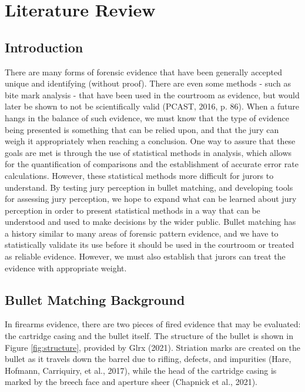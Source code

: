 \documentclass[print]{nuthesis}
\begin{document}
\hypertarget{litreview}{%
\chapter{Literature Review}\label{litreview}}

\hypertarget{introduction}{%
\section{Introduction}\label{introduction}}

There are many forms of forensic evidence that have been generally accepted  unique and identifying (without proof).
There are even some methods - such as bite mark analysis - that have been used in the courtroom as evidence, but would later be shown to not be scientifically valid (PCAST, 2016, p. 86).
When a  future hangs in the balance of such evidence, we must know that the type of evidence being presented is something that can be relied upon, and that the jury can weigh it appropriately when reaching a conclusion.
One way to assure that these goals are met is through the use of statistical methods in analysis, which allows for the quantification of comparisons and the establishment of accurate error rate calculations.
However,  these statistical methods  more difficult for jurors to understand.
By testing jury perception in bullet matching, and developing tools for assessing jury perception, we hope to expand what can be learned about jury perception in order to present statistical methods in a way that can be understood and used to make decisions by the wider public.
Bullet matching has a history similar to many areas of forensic pattern evidence, and we have to statistically validate its use before it should be used in the courtroom or treated as reliable evidence.
However, we must also establish that jurors can treat the evidence with appropriate weight.

\hypertarget{bullet-matching-background}{%
\section{Bullet Matching Background}\label{bullet-matching-background}}

In firearms evidence, there are two pieces of fired evidence that may be evaluated: the cartridge casing and the bullet itself.
The structure of the bullet is shown in Figure \ref{fig:structure}, provided by Glrx (2021).
Striation marks are created on the bullet as it travels down the barrel due to rifling, defects, and impurities (Hare, Hofmann, Carriquiry, et al., 2017), while the head of the cartridge casing is marked by the breech face and aperture sheer (Chapnick et al., 2021).
\end{document}
